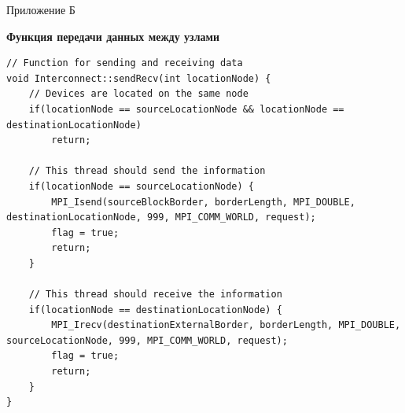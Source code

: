 \documentclass[a4paper, 14pt]{extarticle}
\theoremstyle{definition}
\begin{document}
\newpage

\begin{flushright}
Приложение Б
\end{flushright}

\begin{center}
\textbf{Функция передачи данных между узлами}
\end{center}

\begin{lstlisting}
// Function for sending and receiving data
void Interconnect::sendRecv(int locationNode) {
	// Devices are located on the same node
	if(locationNode == sourceLocationNode && locationNode == destinationLocationNode)
		return;
		
	// This thread should send the information
	if(locationNode == sourceLocationNode) {
		MPI_Isend(sourceBlockBorder, borderLength, MPI_DOUBLE, destinationLocationNode, 999, MPI_COMM_WORLD, request);
		flag = true;
		return;
	}

	// This thread should receive the information
	if(locationNode == destinationLocationNode) {
		MPI_Irecv(destinationExternalBorder, borderLength, MPI_DOUBLE, sourceLocationNode, 999, MPI_COMM_WORLD, request);
		flag = true;
		return;
	}
}
\end{lstlisting}
\end{document}
